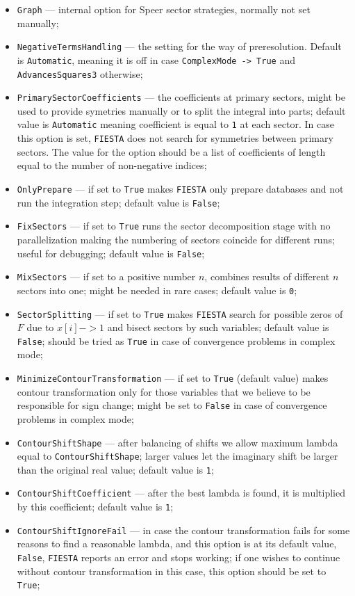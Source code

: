 \documentclass[preprint,12pt]{elsarticle}
\begin{document}
\begin{itemize}
 \item {\tt Graph} --- internal option for Speer sector strategies, normally not set manually;
 \item {\tt NegativeTermsHandling} --- the setting for the way of preresolution. Default is {\tt Automatic}, meaning it is off in case {\tt ComplexMode -> True} and {\tt AdvancesSquares3} otherwise;
 \item {\tt PrimarySectorCoefficients} --- the coefficients at primary sectors, might be used to provide symetries manually or to split the integral into parts; default value is {\tt Automatic} meaning coefficient is equal to {\tt 1} at each sector. In case this option is set, {\tt FIESTA} does not search for symmetries between primary sectors. The value for the option should be a list of coefficients of length equal to the number of non-negative indices;
 \item {\tt OnlyPrepare} --- if set to {\tt True} makes {\tt FIESTA} only prepare databases and not run the integration step; default value is {\tt False};
 \item {\tt FixSectors} --- if set to {\tt True} runs the sector decomposition stage with no parallelization making the numbering of sectors coincide for different runs; useful for debugging; default value is {\tt False};
 \item {\tt MixSectors} --- if set to a positive number $n$, combines results of different $n$ sectors into one; might be needed in rare cases; default value is {\tt 0};
 \item {\tt SectorSplitting} --- if set to {\tt True} makes {\tt FIESTA} search for possible zeros of $F$ due to $x[i]->1$ and bisect sectors by such variables; default value is {\tt False}; should be tried as {\tt True} in case of convergence problems in complex mode;
 \item {\tt MinimizeContourTransformation} --- if set to {\tt True} (default value) makes contour transformation only for those variables that we believe to be responsible for sign change; might be set to {\tt False} in case of convergence problems in complex mode;
 \item {\tt ContourShiftShape} --- after balancing of shifts we allow maximum lambda equal to {\tt ContourShiftShape}; larger values let the imaginary shift be larger than the original real value; default value is {\tt 1};
 \item {\tt ContourShiftCoefficient} --- after the best lambda is found, it is multiplied by this coefficient; default value is {\tt 1};
 \item {\tt ContourShiftIgnoreFail} --- in case the contour transformation fails for some reasons to find a reasonable lambda, and this option is at its default value, {\tt False}, {\tt FIESTA} reports an error and stops working; if one wishes to continue without contour transformation in this case, this option should be set to {\tt True};

\end{itemize}
\end{document}
